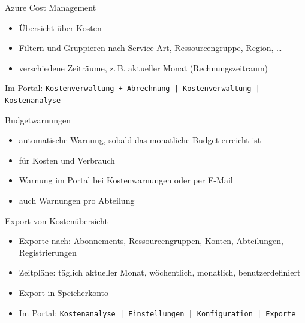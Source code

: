 
\begin{flashcard}[Definition]{Azure Cost Management}

    \begin{itemize}
        \item Übersicht über Kosten
        \item Filtern und Gruppieren nach Service-Art, Ressourcengruppe, Region, \ldots
        \item verschiedene Zeiträume, z.\,B. aktueller Monat (Rechnungszeitraum)
    \end{itemize}
    Im Portal: \texttt{Kostenverwaltung + Abrechnung | Kostenverwaltung | Kostenanalyse}
\end{flashcard}

\begin{flashcard}[Definition]{Budgetwarnungen}
    \begin{itemize}
        \item automatische Warnung, sobald das monatliche Budget erreicht ist
        \item für Kosten und Verbrauch
        \item Warnung im Portal bei Kostenwarnungen oder per E-Mail
        \item auch Warnungen pro Abteilung
    \end{itemize}
\end{flashcard}


\begin{flashcard}[Definition]{Export von Kostenübersicht}
    \begin{itemize}
        \item Exporte nach: Abonnements, Ressourcengruppen, Konten, Abteilungen, Registrierungen
        \item Zeitpläne: täglich aktueller Monat, wöchentlich, monatlich, benutzerdefiniert
        \item Export in Speicherkonto
        \item Im Portal:\newline
            \texttt{Kostenanalyse | Einstellungen | Konfiguration | Exporte }
    \end{itemize}
\end{flashcard}


